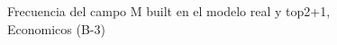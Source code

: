 \begin{figure}[H]
    \centering
    
    \caption{Frecuencia del campo M built en el modelo real y top2+1, Economicos (B-3)}
    \label{frecuency-M Built-top2+1}
\end{figure}